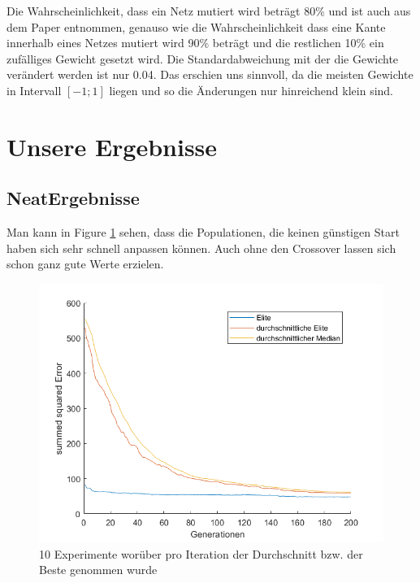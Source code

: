 \documentclass{hbrs-ecta-report}
\begin{document}
Die Wahrscheinlichkeit, dass ein Netz mutiert wird beträgt 80\% und ist auch aus dem Paper entnommen, genauso wie die Wahrscheinlichkeit dass eine Kante innerhalb eines Netzes mutiert wird 90\% beträgt und die restlichen 10\% ein zufälliges Gewicht gesetzt wird. Die Standardabweichung mit der die Gewichte verändert werden ist nur 0.04. Das erschien uns sinnvoll, da die meisten Gewichte in Intervall $[-1;1]$ liegen und so die Änderungen nur hinreichend klein sind.
\newpage
\section{Unsere Ergebnisse}
\subsection{NeatErgebnisse}
Man kann in Figure \ref{fig:NeatElite} sehen, dass die Populationen, die keinen günstigen Start haben sich sehr schnell anpassen können. Auch ohne den Crossover lassen sich schon ganz gute Werte erzielen.\\
\begin{figure}[h!]
	\includegraphics[width=\linewidth]{img/NeatElite}
	\caption{10 Experimente worüber pro Iteration der Durchschnitt bzw. der Beste genommen wurde}
	\label{fig:NeatElite}
\end{figure}
\end{document}
